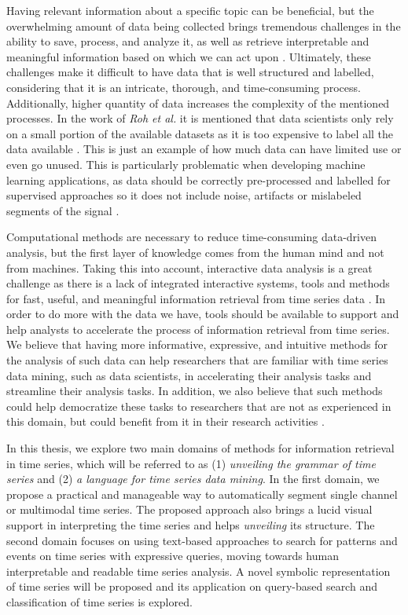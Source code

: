 Having relevant information about a specific topic can be beneficial, but the overwhelming amount of data being collected brings tremendous challenges in the ability to save, process, and analyze it, as well as retrieve interpretable and meaningful information based on which we can act upon \cite{bigdata}. Ultimately, these challenges make it difficult to have data that is well structured and labelled, considering that it is an intricate, thorough, and time-consuming process. Additionally, higher quantity of data increases the complexity of the mentioned processes. In the work of \textit{Roh et al.} it is mentioned that data scientists only rely on a small portion of the available datasets as it is too expensive to label all the data available \cite{roh2019survey}. This is just an example of how much data can have limited use or even go unused. This is particularly problematic when developing machine learning applications, as data should be correctly pre-processed and labelled for supervised approaches so it does not include noise, artifacts or mislabeled segments of the signal \cite{roh2019survey}. 

Computational methods are necessary to reduce time-consuming data-driven analysis, but the first layer of knowledge comes from the human mind and not from machines. Taking this into account, interactive data analysis is a great challenge as there is a lack of integrated interactive systems, tools and methods for fast, useful, and meaningful information retrieval from time series data \cite{intuition1, intuition2, holzinger, machado2015}. In order to do more with the data we have, tools should be available to support and help analysts to accelerate the process of information retrieval from time series. We believe that having more informative, expressive, and intuitive methods for the analysis of such data can help researchers that are familiar with time series data mining, such as data scientists, in accelerating their analysis tasks and streamline their analysis tasks. In addition, we also believe that such methods could help democratize these tasks to researchers that are not as experienced in this domain, but could benefit from it in their research activities \cite{democratize}.

In this thesis, we explore two main domains of methods for information retrieval in time series, which will be referred to as (1) \textit{unveiling the grammar of time series} and (2) \textit{a language for time series data mining}. In the first domain, we propose a practical and manageable way to automatically segment single channel or multimodal time series. The proposed approach also brings a lucid visual support in interpreting the time series and helps \textit{unveiling} its structure. The second domain focuses on using text-based approaches to search for patterns and events on time series with expressive queries, moving towards human interpretable and readable time series analysis. A novel symbolic representation of time series will be proposed and its application on query-based search and classification of time series is explored.

